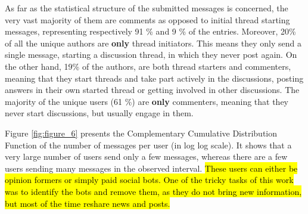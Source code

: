 \documentclass[runningheads]{llncs}
\begin{document}

As far as the statistical structure of the submitted messages is concerned, the very vast majority of them are comments as opposed to initial thread starting messages, representing respectively 91 \% and 9 \% of the entries. Moreover, 20\% of all the unique authors are \textbf{only} thread initiators. This means they only send a single message, starting a discussion thread, in which they never post again. On the other hand, 19\% of the authors, are both thread starters and commenters, meaning that they start threads and take part actively in the discussions, posting answers in their own started thread or getting involved in other discussions. The majority of the unique users (61 \%)  are \textbf{only} commenters, meaning that they never start discussions, but usually engage in them.

Figure \ref{fig:figure_6} presents the Complementary Cumulative Distribution Function of the number of messages per user (in log log scale). It shows that a very large number of users send only a few messages, whereas there are a few users sending many messages in the observed interval. 
\hl{These users can either be opinion formers or simply paid social bots. One of the tricky tasks of this work was to identify the bots and remove them, as they do not bring new information, but most of the time reshare news and posts.}


\end{document}
